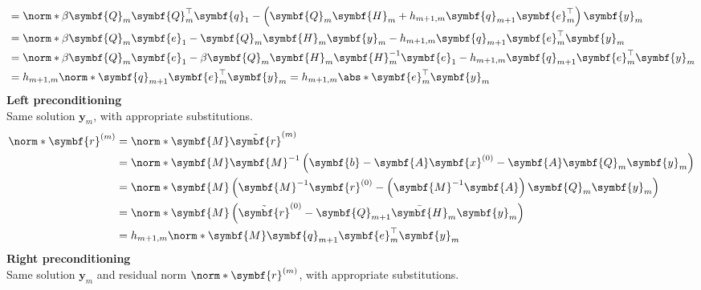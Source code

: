 \documentclass{article}
\begin{document}
\begin{multicols}{2}
\begin{align*}
                                             & = \norm*{\beta \symbf{Q}_m \symbf{Q}_m^\top \symbf{q}_1 - \left( \symbf{Q}_m \symbf{H}_m + h_{m+1,m} \symbf{q}_{m+1} \symbf{e}_m^\top \right) \symbf{y}_m}    \\
                                             & = \norm*{\beta \symbf{Q}_m \symbf{e}_1 - \symbf{Q}_m \symbf{H}_m \symbf{y}_m - h_{m+1,m} \symbf{q}_{m+1} \symbf{e}_m^\top \symbf{y}_m}                        \\
                                             & = \norm*{\beta \symbf{Q}_m \symbf{e}_1 - \beta \symbf{Q}_m \symbf{H}_m \symbf{H}_m^{-1} \symbf{e}_1 - h_{m+1,m} \symbf{q}_{m+1} \symbf{e}_m^\top \symbf{y}_m} \\
                                             & = h_{m+1,m} \norm*{\symbf{q}_{m+1} \symbf{e}_m^\top \symbf{y}_m} = h_{m+1,m} \abs*{\symbf{e}_m^\top \symbf{y}_m}
    \end{align*}
    \textbf{Left preconditioning} \\
    Same solution \(\symbf{y}_m\), with appropriate substitutions.
    \begin{align*}
        \norm*{\symbf{r}^{\left( m \right)}} & = \norm*{\symbf{M} \tilde{\symbf{r}}^{\left( m \right)}}                                                                                                                               \\
                                             & = \norm*{\symbf{M} \symbf{M}^{-1} \left( \symbf{b} - \symbf{A} \symbf{x}^{\left( 0 \right)} - \symbf{A} \symbf{Q}_m \symbf{y}_m \right)}                                               \\
                                             & = \norm*{\symbf{M} \left( \symbf{M}^{-1} \symbf{r}^{\left( 0 \right)} - \left( \symbf{M}^{-1} \symbf{A} \right) \symbf{Q}_m \symbf{y}_m \right)}                                       \\
                                             & = \norm*{\symbf{M} \left( \tilde{\symbf{r}}^{\left( 0 \right)} - \symbf{Q}_{m+1} \bar{\symbf{H}}_m \symbf{y}_m \right)}                                                                \\
                                             & = h_{m+1,m} \norm*{\symbf{M} \symbf{q}_{m+1} \symbf{e}_m^\top \symbf{y}_m}
    \end{align*}
    \textbf{Right preconditioning} \\
    Same solution \(\symbf{y}_m\) and residual norm \(\norm*{\symbf{r}^{\left( m \right)}}\), with appropriate
    substitutions.
    \columnbreak

\end{multicols}
\end{document}
